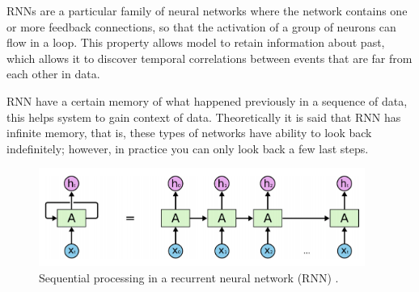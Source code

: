 \vspace{5mm} %

RNNs are a particular family of neural networks where the network contains one or more feedback connections, so that the activation of a group of neurons can flow in a loop. This property allows model to retain information about past, which allows it to discover temporal correlations between events that are far from each other in data.

\vspace{5mm} %

RNN have a certain memory of what happened previously in a sequence of data, this helps system to gain context of data. Theoretically it is said that RNN has infinite memory, that is, these types of networks have ability to look back indefinitely; however, in practice you can only look back a few last steps.

\begin{figure}[h!]
  \begin{center}	\includegraphics[width=0.95\textwidth, frame]{imagenes/Cap4/rnn}
  \caption{Sequential processing in a recurrent neural network (RNN) \protect\cite{Reference53}.}
  \label{fig:rnn}
  \end{center}
\end{figure}

